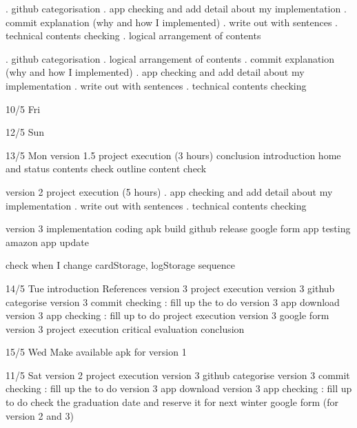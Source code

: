 \1. github categorisation
\2. app checking and add detail about my implementation
\3. commit explanation (why and how I implemented)
\4. write out with sentences
\5. technical contents checking 
\6. logical arrangement of contents

\1. github categorisation
\2. logical arrangement of contents
\3. commit explanation (why and how I implemented)
\4. app checking and add detail about my implementation
\5. write out with sentences
\6. technical contents checking 


10/5 Fri

12/5 Sun 


13/5 Mon
version 1.5 project execution (3 hours)
    conclusion
    introduction
    home and status contents check
    outline content check

version 2 project execution (5 hours)
    \2. app checking and add detail about my implementation
    \4. write out with sentences
    \5. technical contents checking 

version 3 implementation
    coding 
    apk build
    github release
    google form
    app testing
    amazon app update

check when I change cardStorage, logStorage sequence


14/5 Tue
introduction
References
version 3 project execution
version 3 github categorise 
version 3 commit checking : fill up the to do
version 3 app download 
version 3 app checking : fill up to do
project execution version 3
google form version 3
project execution
critical evaluation
conclusion

15/5 Wed
Make available apk for version 1





11/5 Sat
version 2 project execution
version 3 github categorise 
version 3 commit checking : fill up the to do
version 3 app download 
version 3 app checking : fill up to do
check the graduation date and reserve it for next winter
google form (for version 2 and 3)


